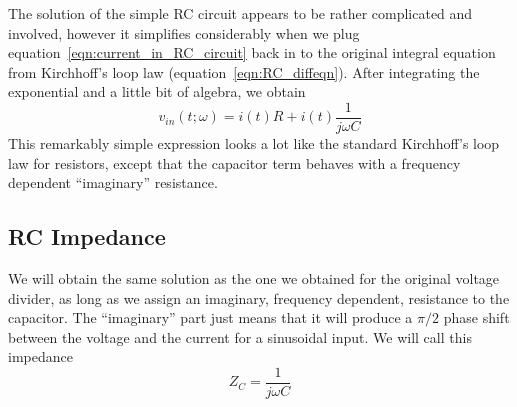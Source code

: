 \documentclass{article}
\begin{document}
The solution of the simple RC circuit appears to be rather complicated and involved, however it simplifies considerably when we plug equation~\ref{eqn:current_in_RC_circuit} back in to the original integral equation from Kirchhoff's loop law (equation~\ref{eqn:RC_diffeqn}). After integrating the exponential and a little bit of algebra, we obtain
\begin{equation}
v_{in}(t;\omega) = i(t) R + i(t) \frac{1}{j\omega C}
\end{equation}
This remarkably simple expression looks a lot like the standard Kirchhoff's loop law for resistors, except that the capacitor term behaves with a frequency dependent ``imaginary'' resistance.

\subsection{RC Impedance}
We will obtain the same solution as the one we obtained for the original voltage divider, as long as we assign an imaginary, frequency dependent, resistance to the capacitor. The ``imaginary'' part just means that it will produce a $\pi/2$ phase shift between the voltage and the current for a sinusoidal input. We will call this impedance
\begin{equation}
Z_C = \frac{1}{j \omega C}
\end{equation}
\end{document}
